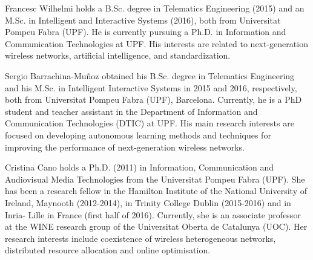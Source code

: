 \documentclass{ieeeaccess}
\begin{document}



\begin{IEEEbiography}{Francesc Wilhelmi} holds a B.Sc. degree in Telematics Engineering (2015) and an M.Sc. in Intelligent and Interactive Systems (2016), both from Universitat Pompeu Fabra (UPF). He is currently pursuing a Ph.D. in Information and Communication Technologies at UPF. His interests are related to next-generation wireless networks, artificial intelligence, and standardization.
\end{IEEEbiography}

\begin{IEEEbiography}{Sergio Barrachina-Mu\~noz} obtained his B.Sc. degree in Telematics Engineering and his M.Sc. in Intelligent Interactive Systems in 2015 and 2016, respectively, both from Universitat Pompeu Fabra (UPF), Barcelona. Currently, he is a PhD student and teacher assistant in the Department of Information and Communication Technologies (DTIC) at UPF. His main research interests are focused on developing autonomous learning methods and techniques for improving the performance of next-generation wireless networks.
\end{IEEEbiography}

\begin{IEEEbiography}{Cristina Cano} holds a Ph.D. (2011) in Information, Communication and Audiovisual Media Technologies from the Universitat Pompeu Fabra (UPF). She has been a research fellow in the Hamilton Institute of the National University of Ireland, Maynooth (2012-2014), in Trinity College Dublin (2015-2016) and in Inria- Lille in France (first half of 2016). Currently, she is an associate professor at the WINE research group of the Universitat Oberta de Catalunya (UOC). Her research interests include coexistence of wireless heterogeneous networks, distributed resource allocation and online optimisation. 
\end{IEEEbiography}
\end{document}
